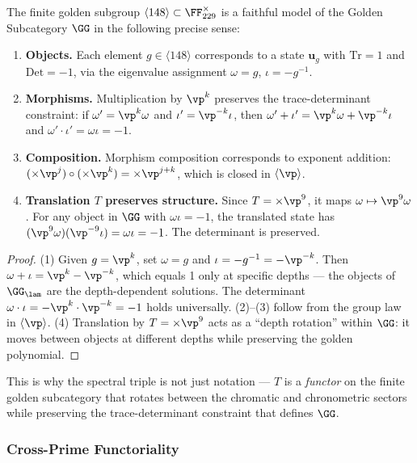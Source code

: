\begin{proposition}\label{prop:faithful}
The finite golden subgroup $\langle 148 \rangle \subset \FF_{229}^\times$ is a faithful model of the Golden Subcategory $\GG$ in the following precise sense:
\begin{enumerate}
\item \textbf{Objects.} Each element $g \in \langle 148 \rangle$ corresponds to a state $\mathbf{u}_g$ with $\mathrm{Tr} = 1$ and $\mathrm{Det} = -1$, via the eigenvalue assignment $\omega = g$, $\iota = -g^{-1}$.
\item \textbf{Morphisms.} Multiplication by $\vp^k$ preserves the trace-determinant constraint: if $\omega' = \vp^k \omega$ and $\iota' = \vp^{-k}\iota$, then $\omega' + \iota' = \vp^k\omega + \vp^{-k}\iota$ and $\omega' \cdot \iota' = \omega\iota = -1$.
\item \textbf{Composition.} Morphism composition corresponds to exponent addition: $(\times\vp^j) \circ (\times\vp^k) = \times\vp^{j+k}$, which is closed in $\langle\vp\rangle$.
\item \textbf{Translation $T$ preserves structure.} Since $T = \times\vp^9$, it maps $\omega \mapsto \vp^9\omega$. For any object in $\GG$ with $\omega\iota = -1$, the translated state has $(\vp^9\omega)(\vp^{-9}\iota) = \omega\iota = -1$. The determinant is preserved.
\end{enumerate}
\end{proposition}
\begin{proof}
(1) Given $g = \vp^k$, set $\omega = g$ and $\iota = -g^{-1} = -\vp^{-k}$. Then $\omega + \iota = \vp^k - \vp^{-k}$, which equals 1 only at specific depths --- the objects of $\GG_{\lam}$ are the depth-dependent solutions. The determinant $\omega \cdot \iota = -\vp^k \cdot \vp^{-k} = -1$ holds universally. (2)--(3) follow from the group law in $\langle\vp\rangle$. (4) Translation by $T = \times\vp^9$ acts as a ``depth rotation'' within $\GG$: it moves between objects at different depths while preserving the golden polynomial. \qedhere
\end{proof}

This is why the spectral triple is not just notation --- $T$ is a \emph{functor} on the finite golden subcategory that rotates between the chromatic and chronometric sectors while preserving the trace-determinant constraint that defines $\GG$.

\subsubsection*{Cross-Prime Functoriality}


